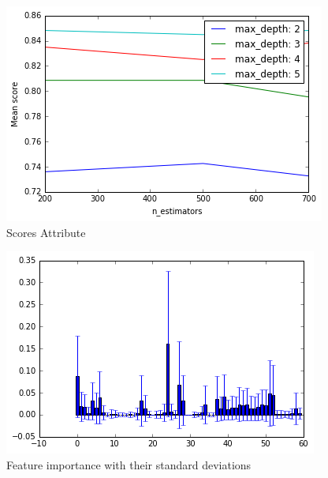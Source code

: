 \begin{figure}
    \centering
    \includegraphics[width=1.0\columnwidth]{images/output_15_1.png}
    \caption{Scores Attribute}\label{Score}
\end{figure}

\begin{figure}
    \centering
    \includegraphics[width=1.0\columnwidth]{images/output_17_0.png}
    \caption{Feature importance with their standard deviations}\label{Featites Format}
\end{figure}


